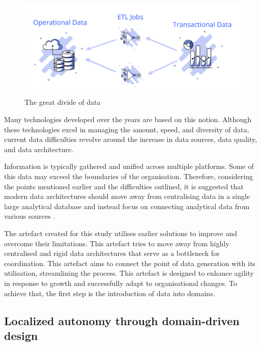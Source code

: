 \documentclass[review]{elsarticle}
\begin{document}
\begin{figure}[ht]

  \centering

  \includegraphics[width=\linewidth]{images/data-planes.png}

  \caption{The great divide of data}

  \label{fig:dataPlanes}

\end{figure}

Many technologies developed over the years are based on this notion. Although these technologies excel in managing the amount, speed, and diversity of data, current data difficulties revolve around the increase in data sources, data quality, and data architecture. 

Information is typically gathered and unified across multiple platforms. Some of this data may exceed the boundaries of the organisation. Therefore, considering the points mentioned earlier and the difficulties outlined, it is suggested that modern data architectures should move away from centralising data in a single large analytical database and instead focus on connecting analytical data from various sources \cite{ataei2022state,DataMesh}. 

The artefact created for this study utilises earlier solutions to improve and overcome their limitations. This artefact tries to move away from highly centralised and rigid data architectures that serve as a bottleneck for coordination. This artefact aims to connect the point of data generation with its utilisation, streamlining the process. This artefact is designed to enhance agility in response to growth and successfully adapt to organisational changes. To achieve that, the first step is the introduction of data into domains. 

\subsection{Localized autonomy through domain-driven design}
\end{document}
